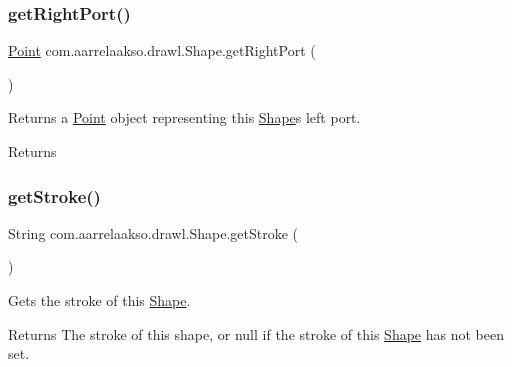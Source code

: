 \subsubsection{\texorpdfstring{get\+Right\+Port()}{getRightPort()}}
{\footnotesize\ttfamily \hyperlink{classcom_1_1aarrelaakso_1_1drawl_1_1_point}{Point} com.\+aarrelaakso.\+drawl.\+Shape.\+get\+Right\+Port (\begin{DoxyParamCaption}{ }\end{DoxyParamCaption})\hspace{0.3cm}{\ttfamily [inherited]}}



Returns a \hyperlink{classcom_1_1aarrelaakso_1_1drawl_1_1_point}{Point} object representing this \hyperlink{classcom_1_1aarrelaakso_1_1drawl_1_1_shape}{Shape}\textquotesingle{}s left port. 

\begin{DoxyReturn}{Returns}

\end{DoxyReturn}
\mbox{\label{classcom_1_1aarrelaakso_1_1drawl_1_1_shape_a4e1d54c7e161e3af5053939ddefdf9e6}} 
\subsubsection{\texorpdfstring{get\+Stroke()}{getStroke()}}
{\footnotesize\ttfamily String com.\+aarrelaakso.\+drawl.\+Shape.\+get\+Stroke (\begin{DoxyParamCaption}{ }\end{DoxyParamCaption})\hspace{0.3cm}{\ttfamily [inherited]}}



Gets the stroke of this \hyperlink{classcom_1_1aarrelaakso_1_1drawl_1_1_shape}{Shape}. 

\begin{DoxyReturn}{Returns}
The stroke of this shape, or null if the stroke of this \hyperlink{classcom_1_1aarrelaakso_1_1drawl_1_1_shape}{Shape} has not been set. 
\end{DoxyReturn}
\mbox{\label{classcom_1_1aarrelaakso_1_1drawl_1_1_circle_adc826cc2d93eb4e78318035c86d00f03}} 
